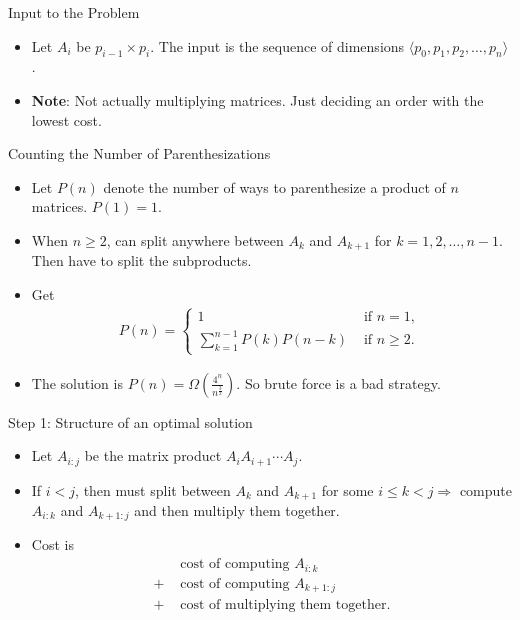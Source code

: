 \documentclass[aspectratio=169]{beamer}
\begin{document}
\begin{frame}{Input to the Problem}
    \begin{itemize}
        \item Let $A_i$ be $p_{i - 1} \times p_i$. The input is the sequence of dimensions $\langle p_0, p_1, p_2, \ldots , p_n \rangle$.
        \item \textbf{Note}: Not actually multiplying matrices. Just deciding an order with the lowest cost.
    \end{itemize}
\end{frame}

\begin{frame}{Counting the Number of Parenthesizations}
    \begin{itemize}
        \item Let $P(n)$ denote the number of ways to parenthesize a product of $n$ matrices. $P(1) = 1$.
        \item When $n \geq 2$, can split anywhere between $A_k$ and $A_{k + 1}$ for $k = 1, 2, \ldots, n - 1$. Then have to split the subproducts.
        \item Get
            \begin{equation*}
                \begin{align*}
                    P(n) =
                        \begin{cases}
                            1 & \text{ if } n = 1 \text{, } \\
                            \sum_{k = 1}^{n - 1} P(k)P(n - k) & \text{ if } n \geq 2 \text{.}
                        \end{cases}
                \end{align*}
            \end{equation*}
        \item The solution is $P(n) = \Omega \left( \frac{4^n}{n^{\frac{3}{2}}} \right)$. So brute force is a bad strategy.
    \end{itemize}
\end{frame}

\begin{frame}{Step 1: Structure of an optimal solution}
    \begin{itemize}
        \item Let $A_{i:j}$ be the matrix product $A_i A_{i+1} \cdots A_j$.
        \item If $i < j$, then must split between $A_k$ and $A_{k+1}$ for some $i \leq k < j \Rightarrow$  compute $A_{i:k}$ and $A_{k+1:j}$ and then multiply them together.
        \item Cost is
            \begin{equation*}
                \begin{align*}
                        & \text{ cost of computing } A_{i:k} \\
                    +   & \text{ cost of computing } A_{k+1:j} \\
                    +   & \text{ cost of multiplying them together.}
                \end{align*}
            \end{equation*}
    \end{itemize}
\end{frame}
\end{document}
